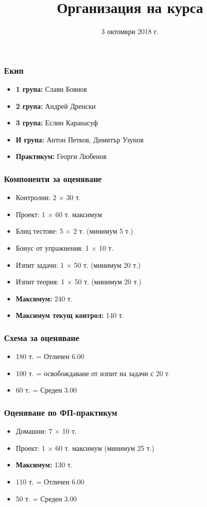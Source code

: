 \documentclass{beamer}
\title{Организация на курса}
\date{3 октомври 2018 г.}
\begin{document}
\begin{frame}
  \titlepage
\end{frame}

\begin{frame}
  \frametitle{Екип}

  \begin{itemize}
  \item \textbf{1 група:} Слави Боянов
  \item \textbf{2 група:} Андрей Дренски
  \item \textbf{3 група:} Еслин Каранасуф
  \item \textbf{И група:} Антон Петков, Димитър Узунов
  \item \textbf{Практикум:} Георги Любенов
  \end{itemize}
\end{frame}

\begin{frame}
  \frametitle{Компоненти за оценяване}

  \begin{itemize}
  \item Контролни: 2 $\times$ 30 т.
  \item Проект: 1 $\times$ 60 т. максимум
  \item Блиц тестове: 5 $\times$ 2 т. \alert{(минимум 5 т.)}
  \item Бонус от упражнения: 1 $\times$ 10 т.
  \item Изпит задачи: 1 $\times$ 50 т. \alert{(минимум 20 т.)}
  \item Изпит теория: 1 $\times$ 50 т. \alert{(минимум 20 т.)}
  \item \textbf{Максимум:} 240 т.
  \item \textbf{Максимум текущ контрол:} 140 т.
  \end{itemize}
\end{frame}

\begin{frame}
  \frametitle{Схема за оценяване}

  \begin{itemize}
  \item 180 т. = Отличен 6.00
  \item 100 т. = освобождаване от изпит на задачи с 20 т.
  \item 60 т. = Среден 3.00
  \end{itemize}
\end{frame}

\begin{frame}
  \frametitle{Оценяване по ФП-практикум}

  \begin{itemize}
  \item Домашни: 7 $\times$ 10 т.
  \item Проект: 1 $\times$ 60 т. максимум \alert{(минимум 25 т.)}
  \item \textbf{Максимум:} 130 т.
  \item 110 т. = Отличен 6.00
  \item 50 т. = Среден 3.00
  \end{itemize}
\end{frame}
\end{document}
